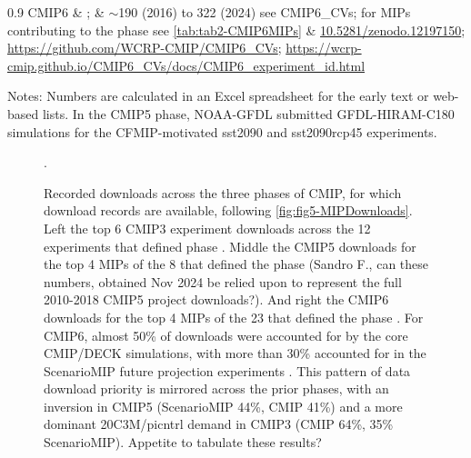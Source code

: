 \documentclass[gmd, preprint]{copernicus}
\def\cred#1{{\color{red}#1}}
\begin{document}
\begin{table}[htp]
{\begin{tabularx}{0.9\textwidth}
			CMIP6 & \citet{eyring_overview_2016}; \citet{durack_cmip6_2024} & $\sim$190 (2016) to 322 (2024) see CMIP6\_CVs; for MIPs contributing to the phase see \autoref{tab:tab2-CMIP6MIPs} & \href{http://doi.org/10.5281/zenodo.12197150}{10.5281/zenodo.12197150}; \url{https://github.com/WCRP-CMIP/CMIP6\_CVs}; \url{https://wcrp-cmip.github.io/CMIP6\_CVs/docs/CMIP6\_experiment\_id.html}\\
			\hline		
		\end{tabularx}
	} %
	\label{tab:tabAppA1-MIPExperiments}
	\footnotesize{Notes: \cred{Numbers are calculated in an Excel spreadsheet for the early text or web-based lists.} In the CMIP5 phase, NOAA-GFDL submitted GFDL-HIRAM-C180 simulations for the CFMIP-motivated sst2090 and sst2090rcp45 experiments.}
\end{table}

\begin{figure}
    \centering
    
    \caption{Recorded downloads across the three phases of CMIP, for which download records are available, following \autoref{fig:fig5-MIPDownloads}. Left the top 6 CMIP3 experiment downloads across the 12 experiments that defined phase \citep{meehl_wcrp_2007}. Middle the CMIP5 downloads for the top 4 MIPs of the 8 that defined the phase \citep[\autoref{tab:tabAppA1-MIPExperiments};][]{taylor_overview_2012} (\cred{Sandro F., can these numbers, obtained Nov 2024 be relied upon to represent the full 2010-2018 CMIP5 project downloads?}). And right the CMIP6 downloads for the top 4 MIPs of the 23 that defined the phase \cite[[see \autoref{tab:tab2-CMIP6MIPs};][]{eyring_overview_2016}. For CMIP6, almost 50\% of downloads were accounted for by the core CMIP/DECK simulations, with more than 30\% accounted for in the ScenarioMIP future projection experiments \citep{oneill_scenario_2016}. This pattern of data download priority is mirrored across the prior phases, with an inversion in CMIP5 (ScenarioMIP 44\%, CMIP 41\%) and a more dominant 20C3M/picntrl demand in CMIP3 (CMIP 64\%, 35\% ScenarioMIP). \cred{Appetite to tabulate these results?}}.
    \label{fig:figA1-MIPDownloads}
\end{figure}
\end{document}
